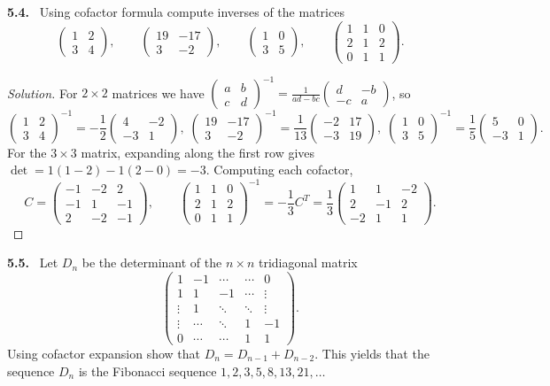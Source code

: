 \documentclass[12pt]{amsart}
\newcommand{\inv}{^{-1}}                    %
\newcommand{\pmat}[1]{\begin{pmatrix}#1\end{pmatrix}}
\theoremstyle{plain}
\theoremstyle{definition}
\theoremstyle{remark}
\newenvironment{problem}[1]{\par\medskip\noindent\textbf{#1.}\ }{\par\smallskip}
\newenvironment{solution}{\begin{proof}[Solution]}{\end{proof}}
\begin{document}
\begin{problem}{5.4}
Using cofactor formula compute inverses of the matrices
\[
  \pmat{1 & 2 \\ 3 & 4}, \qquad
  \pmat{19 & -17 \\ 3 & -2}, \qquad
  \pmat{1 & 0 \\ 3 & 5}, \qquad
  \pmat{1 & 1 & 0 \\ 2 & 1 & 2 \\ 0 & 1 & 1}.
\]
\end{problem}

\begin{solution}
  For
$2\times 2$ matrices we have
$\pmat{a & b \\ c & d}\inv = \frac{1}{ad - bc}\pmat{d & -b \\ -c & a}$, so
\[
  \pmat{1 & 2 \\ 3 & 4}\inv = -\frac{1}{2}\pmat{4 & -2 \\ -3 & 1}, \;
  \pmat{19 & -17 \\ 3 & -2}\inv = \frac{1}{13}\pmat{-2 & 17 \\ -3 & 19}, \;
  \pmat{1 & 0 \\ 3 & 5}\inv = \frac{1}{5}\pmat{5 & 0 \\ -3 & 1}.
\]
For the $3\times 3$ matrix, expanding along the first row gives
$\det = 1(1 - 2) - 1(2 - 0) = -3$. Computing each cofactor,
\[
  C = \pmat{-1 & -2 & 2 \\ -1 & 1 & -1 \\ 2 & -2 & -1}, \qquad
  \pmat{1 & 1 & 0 \\ 2 & 1 & 2 \\ 0 & 1 & 1}\inv
  = -\frac{1}{3}C^T
  = \frac{1}{3}\pmat{1 & 1 & -2 \\ 2 & -1 & 2 \\ -2 & 1 & 1}.
\]

\end{solution}

\begin{problem}{5.5}
Let $D_n$ be the determinant of the $n\times n$ tridiagonal matrix
\[
  \pmat{
    1 & -1 &   \cdots     &    \cdots    & 0  \\
    1 & 1  & -1     &    \cdots    &   \vdots \\
    \vdots  & 1  & \ddots & \ddots &   \vdots \\
    \vdots  &  \cdots  & \ddots & 1      & -1 \\
    0 &  \cdots   &     \cdots   & 1      & 1
  }.
\]
Using cofactor expansion show that $D_n = D_{n-1} + D_{n-2}$. This yields that the sequence $D_n$ is the Fibonacci sequence $1, 2, 3, 5, 8, 13, 21, \dots$
\end{problem}
\end{document}
